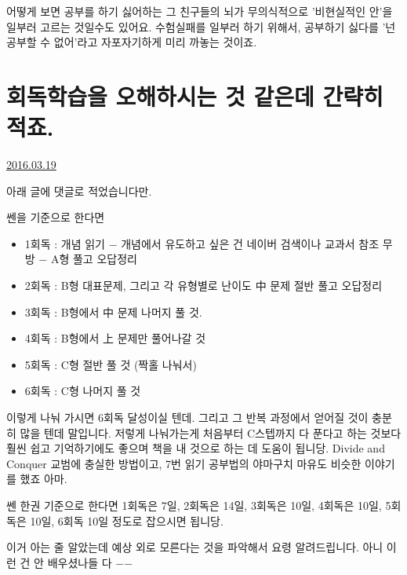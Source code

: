 어떻게 보면 공부를 하기 싫어하는 그 친구들의 뇌가 무의식적으로 '비현실적인 안'을 일부러 고르는 것일수도 있어요.
수험실패를 일부러 하기 위해서, 공부하기 싫다를 '넌 공부할 수 없어'라고 자포자기하게 미리 까놓는 것이죠.
\vspace{5mm}






\section{회독학습을 오해하시는 것 같은데 간략히 적죠.}
\href{https://www.kockoc.com/Apoc/683063}{2016.03.19}

\vspace{5mm}

아래 글에 댓글로 적었습니다만.
\vspace{5mm}

쎈을 기준으로 한다면
\vspace{5mm}
\begin{itemize}
    \item 1회독 : 개념 읽기 $-$ 개념에서 유도하고 싶은 건 네이버 검색이나 교과서 참조 무방 $-$ A형 풀고 오답정리
    \item 2회독 : B형 대표문제, 그리고 각 유형별로 난이도 中 문제 절반 풀고 오답정리
    \item 3회독 : B형에서 中 문제 나머지 풀 것.
    \item 4회독 : B형에서 上 문제만 풀어나갈 것
    \item 5회독 : C형 절반 풀 것 (짝홀 나눠서)
    \item 6회독 : C형 나머지 풀 것
\end{itemize}
\vspace{5mm}

이렇게 나눠 가시면 6회독 달성이실 텐데. 그리고 그 반복 과정에서 얻어질 것이 충분히 많을 텐데 말입니다.
저렇게 나눠가는게 처음부터 C스텝까지 다 푼다고 하는 것보다 훨씬 쉽고 기억하기에도 좋으며 책을 내 것으로 하는 데 도움이 됩니당.
Divide and Conquer 교범에 충실한 방법이고, 7번 읽기 공부법의 야마구치 마유도 비슷한 이야기를 했죠 아마.
\vspace{5mm}

쎈 한권 기준으로 한다면 1회독은 7일, 2회독은 14일, 3회독은 10일, 4회독은 10일, 5회독은 10일, 6회독 10일 정도로 잡으시면 됩니당.
\vspace{5mm}

이거 아는 줄 알았는데 예상 외로 모른다는 것을 파악해서 요령 알려드립니다. 아니 이런 건 안 배우셨나들 다 $-$$-$
\vspace{5mm}

